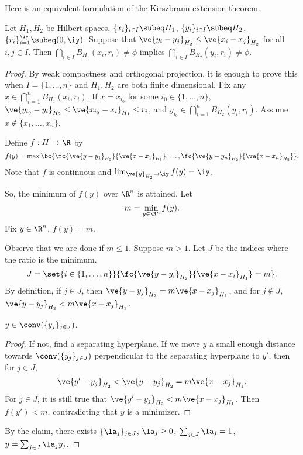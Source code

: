 

Here is an equivalent formulation of the Kirszbraun extension theorem.
\begin{thm}
Let $H_1,H_2$ be Hilbert spaces, $\{x_i\}_{i\in I}\subeq H_1$, $\{y_i\}_{i\in I}\subeq H_2$, $\{r_i\}_{i=1}^{\iy}\subeq (0,\iy)$. Suppose that $\ve{y_i-y_j}_{H_2}\le \ve{x_i-x_j}_{H_2}$ for all $i,j\in I$. Then $\bigcap_{i\in I} B_{H_1}(x_i,r_i) \ne \phi$ implies $\bigcap_{i\in I} B_{H_2} (y_i,r_i) \ne \phi$. 
\end{thm}
\begin{proof}
By weak compactness and orthogonal projection, it is enough to prove this when $I=\{1,\ldots, n\}$ and $H_1,H_2$ are both finite dimensional. Fix any $x\in \bigcap_{i=1}^n B_{H_1}(x_i,r_i)$. If $x=x_{i_0}$ for some $i_0\in \{1,\ldots, n\}$, $\ve{y_{i_0}-y_i}_{H_2}\le \ve{x_{i_0}-x_i}_{H_1}\le r_i$, and $y_{i_0}\in \bigcap_{i=1}^n B_{H_2}(y_i,r_i)$. Assume $x\nin \{x_1,\ldots, x_n\}$. 

Define $f:H\to \R$ by 
\[
f(y) = \max \bc{
\fc{\ve{y-y_1}_{H_2}}{\ve{x-x_1}_{H_1}}, \ldots, \fc{\ve{y-y_n}_{H_2}}{\ve{x-x_n}_{H_2}}
}.
\]
Note that $f$ is continuous and $\lim_{\ve{y}_{H_2}\to \iy} f(y)=\iy$.

So, the minimum of $f(y)$ over $\R^n$ is attained. Let 
\[
m=\min_{y\in \R^n} f(y).
\]
Fix $y\in \R^n$, $f(y)=m$.

Observe that we are done if $m\le 1$.
Suppose \bwoc{} $m>1$. Let $J$ be the indices where the ratio is the minimum. 
\[
J=\set{i\in \{1,\ldots, n\}}{\fc{\ve{y-y_i}_{H_2}}{\ve{x-x_i}_{H_1}}=m}.
\]
By definition, if $j\in J$, then $\ve{y-y_j}_{H_2}=m\ve{x-x_j}_{H_1}$, and for $j\nin J$, $\ve{y-y_j}_{H_2}<m\ve{x-x_j}_{H_1}$. 

\begin{clm}
$y\in \conv(\{y_j\}_{j\in J})$.
\end{clm}
\begin{proof}
If not, find a separating hyperplane. If we move $y$ a small enough distance towards $\conv(\{y_j\}_{j\in J})$ perpendicular to the separating hyperplane to $y'$, then for $j\in J$,
\[
\ve{y'-y_j}_{H_2}<\ve{y-y_j}_{H_2} = m\ve{x-x_j}_{H_1}.
\]
For $j\in J$, it is still true that $\ve{y'-y_j}_{H_2}<m\ve{x-x_j}_{H_1}$. Then $f(y')<m$, contradicting that $y$ is a minimizer.
\end{proof}

By the claim, there exists $\{\la_j\}_{j\in J}$, $\la_j\ge 0$, $\sum_{j\in J}\la_j=1$, $y=\sum_{j\in J}\la_jy_j$. 


\end{proof}
